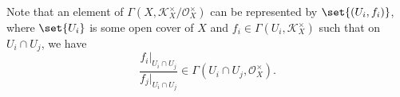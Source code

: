 Note that an element of $\Gamma(X, \mathcal{K}_X^\times/\mathcal{O}_X^\times)$ can be represented
by $\set{(U_i, f_i)}$, where $\set{U_i}$ is some open cover of $X$ and $f_i \in \Gamma(U_i, \mathcal{K}_X^\times)$
such that on $U_i\cap U_j$, we have
\[ \frac{f_i|_{U_i\cap U_j}}{f_j|_{U_i\cap U_j}} \in \Gamma(U_i\cap U_j, \mathcal{O}_X^\times). \]
